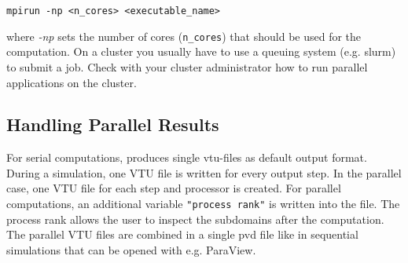 \begin{lstlisting}[style=Bash]
mpirun -np <n_cores> <executable_name>
\end{lstlisting}
%
where \textit{-np} sets the number of cores (\texttt{n\_cores}) that should be used for the
computation. On a cluster you usually have to use a queuing system (e.g. slurm) to
submit a job. Check with your cluster administrator how to run parallel applications on the cluster.

\subsection{Handling Parallel Results}
For serial computations, \Dumux produces single vtu-files as default output format.
During a simulation, one VTU file is written for every output step.
In the parallel case, one VTU file for each step and processor is created.
For parallel computations, an additional variable \texttt{"process rank"} is written
into the file. The process rank allows the user to inspect the subdomains
after the computation. The parallel VTU files are combined in a single pvd file
like in sequential simulations that can be opened with e.g. ParaView.
